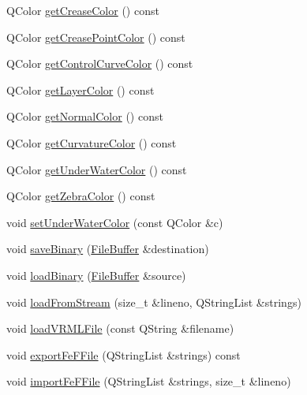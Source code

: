 \begin{DoxyCompactItemize}
\item 
Q\+Color \hyperlink{classShipCAD_1_1SubdivisionSurface_adbe8035c1602e8b2462e6052ffd3f3a4}{get\+Crease\+Color} () const 
\item 
Q\+Color \hyperlink{classShipCAD_1_1SubdivisionSurface_aa5f7a82fc160a3df73ca19d766843bae}{get\+Crease\+Point\+Color} () const 
\item 
Q\+Color \hyperlink{classShipCAD_1_1SubdivisionSurface_a796ee3dc45dd6d25ce8a58e65048c947}{get\+Control\+Curve\+Color} () const 
\item 
Q\+Color \hyperlink{classShipCAD_1_1SubdivisionSurface_adc7aff2be270c70963ddebbdc052b482}{get\+Layer\+Color} () const 
\item 
Q\+Color \hyperlink{classShipCAD_1_1SubdivisionSurface_a57f4c3d9ca6f842f687a882e10454524}{get\+Normal\+Color} () const 
\item 
Q\+Color \hyperlink{classShipCAD_1_1SubdivisionSurface_a18cde95f7390e52722f85f93bdc6f1f1}{get\+Curvature\+Color} () const 
\item 
Q\+Color \hyperlink{classShipCAD_1_1SubdivisionSurface_ad945a6a4c084db07b19504ce5e982a2a}{get\+Under\+Water\+Color} () const 
\item 
Q\+Color \hyperlink{classShipCAD_1_1SubdivisionSurface_a7464bc5ad79381ddc64b86266d3a8da1}{get\+Zebra\+Color} () const 
\item 
void \hyperlink{classShipCAD_1_1SubdivisionSurface_a0b6eee9984eefa4b0c3d1f229eb474ed}{set\+Under\+Water\+Color} (const Q\+Color \&c)
\item 
void \hyperlink{classShipCAD_1_1SubdivisionSurface_a6e6254ecc6fcbdadf1ff4f646caa1d59}{save\+Binary} (\hyperlink{classShipCAD_1_1FileBuffer}{File\+Buffer} \&destination)
\item 
void \hyperlink{classShipCAD_1_1SubdivisionSurface_ac8ad644e0c19ac180fd4a7368fa410a6}{load\+Binary} (\hyperlink{classShipCAD_1_1FileBuffer}{File\+Buffer} \&source)
\item 
void \hyperlink{classShipCAD_1_1SubdivisionSurface_aa7aebfa4567458829323752a96195060}{load\+From\+Stream} (size\+\_\+t \&lineno, Q\+String\+List \&strings)
\item 
void \hyperlink{classShipCAD_1_1SubdivisionSurface_add8d612c82f170869f81042520f62499}{load\+V\+R\+M\+L\+File} (const Q\+String \&filename)
\item 
void \hyperlink{classShipCAD_1_1SubdivisionSurface_adaf0a259c3cb5446c7b4481ac8d98ded}{export\+Fe\+F\+File} (Q\+String\+List \&strings) const 
\item 
void \hyperlink{classShipCAD_1_1SubdivisionSurface_aa3f1904bcec3f104cf465e3bed799406}{import\+Fe\+F\+File} (Q\+String\+List \&strings, size\+\_\+t \&lineno)

\end{DoxyCompactItemize}
